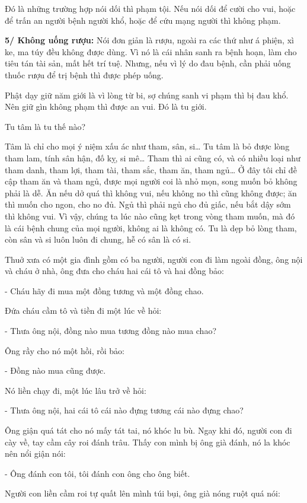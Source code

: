\documentclass[
  12pt,
  oneside]{book}
\begin{document}
Đó là những trường hợp nói dối thì phạm tội. Nếu nói dối để cười cho vui, hoặc để trấn an người bệnh người khổ, hoặc để cứu mạng người thì không phạm.

\textbf{5/ Không uống rượu:} Nói đơn giản là rượu, ngoài ra các thứ như á phiện, xì ke, ma túy đều không được dùng. Vì nó là cái nhân sanh ra bệnh hoạn, làm cho tiêu tán tài sản, mất hết trí tuệ. Nhưng, nếu vì lý do đau bệnh, cần phải uống thuốc rượu để trị bệnh thì được phép uống.

Phật dạy giữ năm giới là vì lòng từ bi, sợ chúng sanh vi phạm thì bị đau khổ. Nên giữ gìn không phạm thì được an vui. Đó là tu giới.

Tu tâm là tu thế nào?

Tâm là chỉ cho mọi ý niệm xấu ác như tham, sân, si\ldots{} Tu tâm là bỏ được lòng tham lam, tính sân hận, đố kỵ, si mê\ldots{} Tham thì ai cũng có, và có nhiều loại như tham danh, tham lợi, tham tài, tham sắc, tham ăn, tham ngủ\ldots{} Ở đây tôi chỉ đề cập tham ăn và tham ngủ, được mọi người coi là nhỏ mọn, song muốn bỏ không phải là dễ. Ăn nếu dở quá thì không vui, nếu không no thì cũng không được; ăn thì muốn cho ngon, cho no đủ. Ngủ thì phải ngủ cho đủ giấc, nếu bắt dậy sớm thì không vui. Vì vậy, chúng ta lúc nào cũng kẹt trong vòng tham muốn, mà đó là cái bệnh chung của mọi người, không ai là không có. Tu là dẹp bỏ lòng tham, còn sân và si luôn luôn đi chung, hễ có sân là có si.

Thuở xưa có một gia đình gồm có ba người, người con đi làm ngoài đồng, ông nội và cháu ở nhà, ông đưa cho cháu hai cái tô và hai đồng bảo:

- Cháu hãy đi mua một đồng tương và một đồng chao.

Đứa cháu cầm tô và tiền đi một lúc về hỏi:

- Thưa ông nội, đồng nào mua tương đồng nào mua chao?

Ông rầy cho nó một hồi, rồi bảo:

- Đồng nào mua cũng được.

Nó liền chạy đi, một lúc lâu trở về hỏi:

- Thưa ông nội, hai cái tô cái nào đựng tương cái nào đựng chao?

Ông giận quá tát cho nó mấy tát tai, nó khóc lu bù. Ngay khi đó, người con đi cày về, tay cầm cây roi đánh trâu. Thấy con mình bị ông già đánh, nó la khóc nên nổi giận nói:

- Ông đánh con tôi, tôi đánh con ông cho ông biết.

Người con liền cầm roi tự quất lên mình túi bụi, ông già nóng ruột quá nói:
\end{document}

